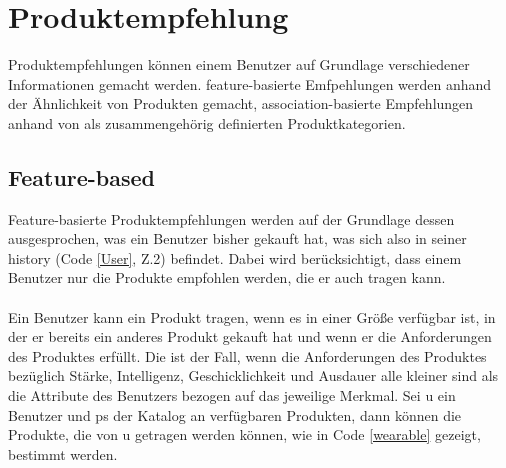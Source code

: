 \chapter{Produktempfehlung}
Produktempfehlungen können einem Benutzer auf Grundlage verschiedener Informationen gemacht werden. feature-basierte Emfpehlungen werden anhand der Ähnlichkeit von Produkten gemacht, association-basierte Empfehlungen anhand von als zusammengehörig definierten Produktkategorien.

\section{Feature-based}
Feature-basierte Produktempfehlungen werden auf der Grundlage dessen aus\-ge\-spro\-chen, was ein Benutzer bisher gekauft hat, was sich also in seiner \textsf{history} (Code \ref{User}, Z.2) befindet. Dabei wird berücksichtigt, dass einem Benutzer nur die Produkte empfohlen werden, die er auch tragen kann. \\
\\
Ein Benutzer kann ein Produkt tragen, wenn es in einer Größe verfügbar ist, in der er bereits ein anderes Produkt gekauft hat und wenn er die Anforderungen des Produktes erfüllt. Die ist der Fall, wenn die Anforderungen des Produktes bezüglich Stärke, Intelligenz, Geschicklichkeit und Ausdauer alle kleiner sind als die Attribute des Benutzers bezogen auf das jeweilige Merkmal. Sei \textsf{u} ein Benutzer und \textsf{ps} der Katalog an verfügbaren Produkten, dann können die Produkte, die von \textsf{u} getragen werden können, wie in Code \ref{wearable} gezeigt, bestimmt werden.

